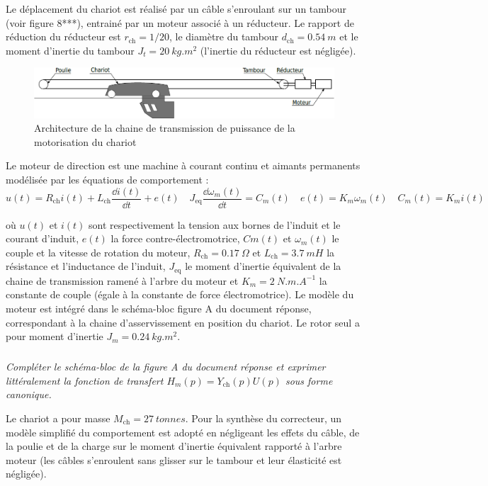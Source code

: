 \documentclass[10pt,fleqn]{article} %
\begin{document}
Le déplacement du chariot est réalisé par un câble s’enroulant sur un tambour (voir figure 8***), entrainé par un
moteur associé à un réducteur. Le rapport de réduction du réducteur est $r_{\text{ch}}= 1/20$, le diamètre du tambour
$d_{\text{ch}}= \SI{0,54}{m}$ et le moment d’inertie du tambour $J_t = \SI{20}{kg.m^2}$ (l’inertie du réducteur est négligée).

\begin{figure}[H]
\centering
\includegraphics[width=.4\linewidth]{images/fig_08}
\caption{Architecture de la chaine de transmission de puissance de la motorisation du chariot \label{fig_08}}
\end{figure}

Le moteur de direction est une machine à courant continu et aimants permanents modélisée par les équations
de comportement :
$$
u(t)=R_{\text{ch}}i(t)+L_{\text{ch}}\dfrac{\dd i(t)}{\dd t}+e(t) 
\quad
J_{\text{eq}}\dfrac{\dd \omega_m(t)}{\dd t} = C_m(t)
\quad 
e(t)=K_m \omega_m(t)
\quad 
C_m(t)=K_m i(t)
$$

où $u(t)$ et $i(t)$ sont respectivement la tension aux bornes de l’induit et le courant d’induit, $e(t)$ la force contre-électromotrice,
$Cm(t)$ et $\omega_m(t)$ le couple et la vitesse de rotation du moteur, $R_{\text{ch}} = \SI{0,17}{\Omega}$ et $L_{\text{ch}} = \SI{3,7}{mH}$ la
résistance et l’inductance de l’induit, $J_{\text{eq}}$ le moment d’inertie équivalent de la chaine de transmission ramené à
l’arbre du moteur et $K_m = \SI{2}{N. m.A^{-1}}$ la constante de couple (égale à la constante de force électromotrice).
Le modèle du moteur est intégré dans le schéma-bloc figure A du document réponse, correspondant à la chaine
d’asservissement en position du chariot. Le rotor seul a pour moment d’inertie $J_m = \SI{0,24}{kg.m^2}$.


\subparagraph{\label{q10}}\textit{Compléter le schéma-bloc de la figure A du document réponse et exprimer littéralement la fonction de transfert $H_m(p) = Y_{\text{ch}}(p)U(p)$ sous forme canonique.}

Le chariot a pour masse $M_{\text{ch}} = \SI{27}{tonnes}$. Pour la synthèse du correcteur, un modèle simplifié du comportement
est adopté en négligeant les effets du câble, de la poulie et de la charge sur le moment d’inertie équivalent rapporté
à l’arbre moteur (les câbles s’enroulent sans glisser sur le tambour et leur élasticité est négligée).
\end{document}
